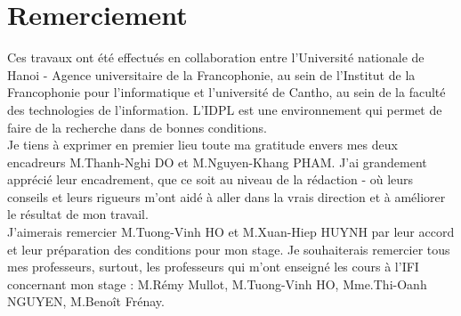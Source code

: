 \chapter*{Remerciement}
Ces travaux ont été effectués en collaboration entre l'Université nationale de Hanoi - Agence universitaire de la Francophonie, au sein de l'Institut de la Francophonie pour l'informatique et l'université de Cantho, au sein de la faculté des technologies de l'information. L'IDPL est une environnement qui permet de faire de la recherche dans de bonnes conditions.\\

Je tiens à exprimer en premier lieu toute ma gratitude envers mes deux encadreurs M.Thanh-Nghi DO et M.Nguyen-Khang PHAM. J'ai grandement apprécié leur encadrement, que ce soit au niveau de la rédaction - où leurs conseils et leurs rigueurs m'ont aidé à aller dans la vrais direction et à améliorer le résultat de mon travail.\\

J'aimerais remercier M.Tuong-Vinh HO et M.Xuan-Hiep HUYNH par leur accord et leur préparation des conditions pour mon stage. Je souhaiterais remercier tous mes professeurs, surtout, les professeurs qui m'ont enseigné les cours à l'IFI concernant mon stage : M.Rémy Mullot, M.Tuong-Vinh HO, Mme.Thi-Oanh NGUYEN, M.Benoît Frénay.
